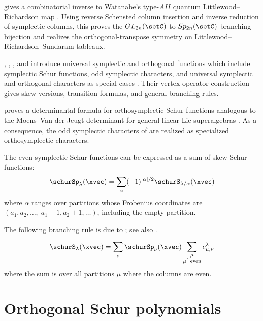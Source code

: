  gives a combinatorial inverse to Watanabe's type-$AII$
quantum Littlewood--Richardson map \cite{Azenhas2026x}.  Using reverse
Schensted column insertion and inverse reduction of symplectic columns, this
proves the $GL_{2n}(\setC)$-to-$Sp_{2n}(\setC)$ branching bijection and
realizes the orthogonal-transpose symmetry on Littlewood--Richardson--Sundaram
tableaux.

, , , and
 introduce universal symplectic and orthogonal functions
which include symplectic Schur functions, odd symplectic characters, and
universal symplectic and orthogonal characters as special cases
\cite{JinJingLiWang2022x}.  Their vertex-operator construction gives skew
versions, transition formulas, and general branching rules.

 proves a determinantal formula for orthosymplectic Schur
functions analogous to the Moens--Van der Jeugt determinant for general
linear Lie superalgebras \cite{Kumari2024x}.  As a consequence, the odd
symplectic characters of  are realized as specialized
orthosymplectic characters.

The even symplectic Schur functions can be expressed as a sum of skew Schur
functions:
\[
\schurSp_\lambda(\xvec) = \sum_\alpha (-1)^{|\alpha|/2} \schurS_{\lambda/\alpha}(\xvec)
\]
where $\alpha$ ranges over partitions whose
\hyperref[prelimPartitions]{Frobenius coordinates} are
$(a_1,a_2,\dotsc, | a_1+1,a_2+1,\dotsc)$,
including the empty partition.


The following branching rule is due to 
\cite[p.~295]{Littlewood1977}; see also \cite[p.~54]{Krattenthaler1998}.
\begin{theorem}[Littlewood]
\[
\schurS_{\lambda}(\xvec)
= \sum_{\nu} \schurSp_\nu(\xvec)
  \sum_{\substack{\mu\\ \mu' \text{ even}}} c^{\lambda}_{\mu,\nu}
\]
where the sum is over all partitions $\mu$ where the columns are even.
\end{theorem}





\section[schurOrthogonal]{Orthogonal Schur polynomials}




